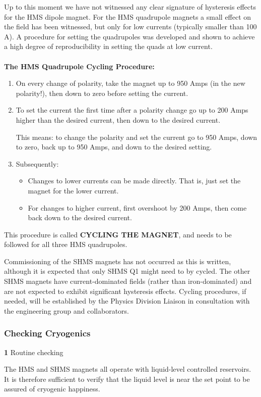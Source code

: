 Up to this moment we have not witnessed any clear signature of hysteresis
effects for the HMS dipole magnet. For the HMS quadrupole magnets a small effect
on the field has been witnessed, but only for low currents (typically smaller
than 100 A). A procedure for setting the quadrupoles was developed
and shown to achieve a high
degree of reproducibility in setting the quads at low current.  
\\
\\
\textbf{The HMS Quadrupole Cycling Procedure:} 
\begin{enumerate}
  \item{On every change of polarity, take the magnet up to 950 Amps 
     (in the new polarity!), then down to zero before setting the
     current.} 
  \item{To set the current the first time after a polarity change 
     go up to 200 Amps higher than the desired current, 
     then down to the desired current.

     This means: to change the polarity and set the current go to 950 Amps,
     down to zero, back up to 950 Amps, and down to the desired setting.}
  \item{Subsequently:
  \begin{itemize}
     \item{Changes to lower currents can be made directly. 
        That is, just set the magnet for the lower current.}
     \item{For changes to higher current, first overshoot 
        by 200 Amps, then come back down to the desired current.}
  \end{itemize}}
\end{enumerate} 
This procedure is called \textbf{CYCLING THE MAGNET}, and needs to be  followed for all three HMS quadrupoles.

Commissioning of the SHMS magnets has not occurred as this is written, although it
is expected that only SHMS Q1 might need to by cycled. The other SHMS magnets have
current-dominated fields (rather than iron-dominated) and are not expected to 
exhibit significant hysteresis effects. Cycling procedures, if needed, will be established by
the Physics Division Liaison in consultation with the engineering group and collaborators.

\subsubsection{Checking Cryogenics}

\begin{description}
\item{\bf 1}\hskip0.1in Routine checking
\item{}\hskip0.3in The HMS and SHMS magnets all operate with liquid-level controlled
reservoirs. It is therefore sufficient to verify that the liquid level
is near the set point to be assured of cryogenic happiness.
\end{description}

